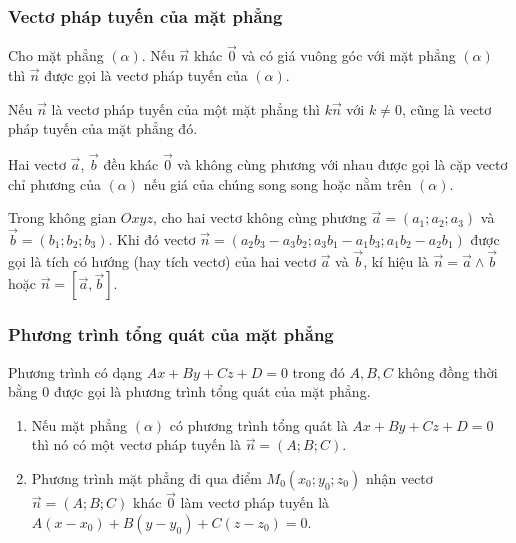 \subsubsection{Vectơ pháp tuyến của mặt phẳng}
\begin{dn}
Cho mặt phẳng $(\alpha)$. Nếu $\overrightarrow{n}$ khác $\overrightarrow{0}$ và có giá vuông góc với mặt phẳng $(\alpha)$ thì $\overrightarrow{n}$ được gọi là vectơ pháp tuyến của $(\alpha)$.
\end{dn}

\begin{note}
Nếu $\overrightarrow{n}$ là vectơ pháp tuyến của một mặt phẳng thì $k \overrightarrow{n}$ với $k\ne0$, cũng là vectơ pháp tuyến của mặt phẳng đó.
\end{note}

\begin{kn}
    Hai vectơ $\overrightarrow{a}$, $\overrightarrow{b}$ đều khác $\overrightarrow{0}$ và không cùng phương với nhau được gọi là cặp vectơ chỉ phương của $(\alpha)$ nếu giá của chúng song song hoặc nằm trên $(\alpha)$.    
\end{kn}

\begin{kn}
Trong không gian $Oxyz$, cho hai vectơ không cùng phương $ \overrightarrow{a}=\left(a_1;a_2;a_3\right)$ và $ \overrightarrow{b}=\left(b_1;b_2;b_3\right)$. Khi đó vectơ $ \overrightarrow{n}=\left(a_2b_3-a_3b_2;a_3b_1-a_1b_3;a_1b_2-a_2b_1\right)$ được gọi là tích có hướng (hay tích vectơ) của hai vectơ $ \overrightarrow{a}$ và $ \overrightarrow{b}$, kí hiệu là $ \overrightarrow{n}= \overrightarrow{a}\wedge  \overrightarrow{b}$ hoặc $ \overrightarrow{n}=\left[ \overrightarrow{a}, \overrightarrow{b}\right]$.
\end{kn}
\subsubsection{Phương trình tổng quát của mặt phẳng}

\begin{dn}
Phương trình có dạng $Ax+By+Cz+D=0$ trong đó $A,B,C$ không đồng thời bằng $0$ được gọi là phương trình tổng quát của mặt phẳng.
\end{dn}

\begin{note}
\begin{enumerate}
   
    \item Nếu mặt phẳng $(\alpha)$ có phương trình tổng quát là $Ax+By+Cz+D=0$ thì nó có một vectơ pháp tuyến là $\overrightarrow{n}=\left(A;B;C\right)$.
    \item Phương trình mặt phẳng đi qua điểm $M_0\left(x_0;y_0;z_0\right)$ nhận vectơ $\overrightarrow{n}=\left(A;B;C\right)$ khác $\overrightarrow{0}$ làm vectơ pháp tuyến là $A\left(x-x_0\right)+B\left(y-y_0\right)+C\left(z-z_0\right)=0$.
\end{enumerate}    
\end{note}

